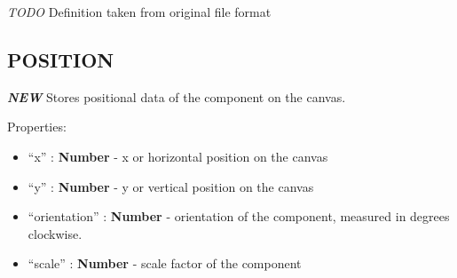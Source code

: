 \emph{TODO}
Definition taken from original file format

\subsection{POSITION}\label{position}

\textbf{\emph{NEW}} Stores positional data of the component on the
canvas.

Properties:

\begin{itemize}
\itemsep1pt\parskip0pt
\item
  ``x'' : \textbf{Number} - x or horizontal position on the canvas
\item
  ``y'' : \textbf{Number} - y or vertical position on the canvas
\item
  ``orientation'' : \textbf{Number} - orientation of the component,
  measured in degrees clockwise.
\item
  ``scale'' : \textbf{Number} - scale factor of the component
\end{itemize}
